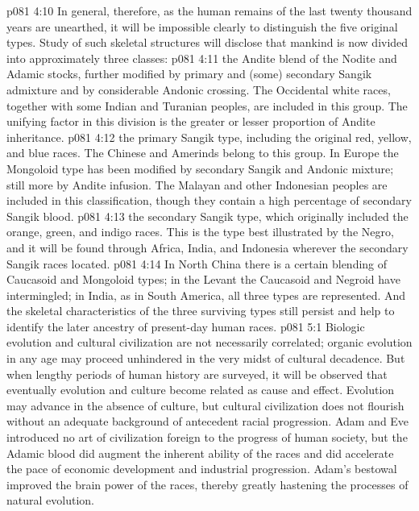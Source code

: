 \vs p081 4:10 In general, therefore, as the human remains of the last twenty thousand years are unearthed, it will be impossible clearly to distinguish the five original types. Study of such skeletal structures will disclose that mankind is now divided into approximately three classes:
\pc \vs p081 4:11 \bibnobreakspace {}the Andite blend of the Nodite and Adamic stocks, further modified by primary and (some) secondary Sangik admixture and by considerable Andonic crossing. The Occidental white races, together with some Indian and Turanian peoples, are included in this group. The unifying factor in this division is the greater or lesser proportion of Andite inheritance.
\pc \vs p081 4:12 \bibnobreakspace {}the primary Sangik type, including the original red, yellow, and blue races. The Chinese and Amerinds belong to this group. In Europe the Mongoloid type has been modified by secondary Sangik and Andonic mixture; still more by Andite infusion. The Malayan and other Indonesian peoples are included in this classification, though they contain a high percentage of secondary Sangik blood.
\pc \vs p081 4:13 \bibnobreakspace {}the secondary Sangik type, which originally included the orange, green, and indigo races. This is the type best illustrated by the Negro, and it will be found through Africa, India, and Indonesia wherever the secondary Sangik races located.
\pc \vs p081 4:14 In North China there is a certain blending of Caucasoid and Mongoloid types; in the Levant the Caucasoid and Negroid have intermingled; in India, as in South America, all three types are represented. And the skeletal characteristics of the three surviving types still persist and help to identify the later ancestry of present\hyp{}day human races.\plusone
{}
\vs p081 5:1 Biologic evolution and cultural civilization are not necessarily correlated; organic evolution in any age may proceed unhindered in the very midst of cultural decadence. But when lengthy periods of human history are surveyed, it will be observed that eventually evolution and culture become related as cause and effect. Evolution may advance in the absence of culture, but cultural civilization does not flourish without an adequate background of antecedent racial progression. Adam and Eve introduced no art of civilization foreign to the progress of human society, but the Adamic blood did augment the inherent ability of the races and did accelerate the pace of economic development and industrial progression. Adam’s bestowal improved the brain power of the races, thereby greatly hastening the processes of natural evolution.
